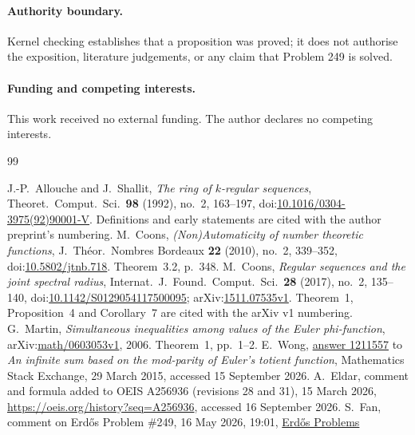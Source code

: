 \paragraph{Authority boundary.} Kernel checking establishes that a proposition
was proved; it does not authorise the exposition, literature judgements, or any
claim that Problem 249 is solved.

\paragraph{Funding and competing interests.} This work received no external
funding. The author declares no competing interests.

\clearpage
\begin{thebibliography}{99}
\small
\raggedright
\setlength{\itemsep}{0pt}
J.-P.~Allouche and J.~Shallit, \emph{The ring of $k$-regular sequences},
Theoret.\ Comput.\ Sci.\ \textbf{98} (1992), no.~2, 163--197,
doi:\href{https://doi.org/10.1016/0304-3975(92)90001-V}{10.1016/0304-3975(92)90001-V}.
Definitions and early statements are cited with the author preprint's numbering.
M.~Coons, \emph{(Non)Automaticity of number theoretic functions},
J.\ Th\'eor.\ Nombres Bordeaux \textbf{22} (2010), no.~2, 339--352,
doi:\href{https://doi.org/10.5802/jtnb.718}{10.5802/jtnb.718}.
Theorem~3.2, p.~348.
M.~Coons, \emph{Regular sequences and the joint spectral radius},
Internat.\ J.\ Found.\ Comput.\ Sci.\ \textbf{28} (2017), no.~2, 135--140,
doi:\href{https://doi.org/10.1142/S0129054117500095}{10.1142/S0129054117500095};
arXiv:\href{https://arxiv.org/abs/1511.07535v1}{1511.07535v1}.
Theorem~1, Proposition~4 and Corollary~7 are cited with the arXiv v1 numbering.
G.~Martin, \emph{Simultaneous inequalities among values of the Euler
phi-function}, arXiv:\href{https://arxiv.org/abs/math/0603053v1}{math/0603053v1}, 2006.
Theorem~1, pp.~1--2.
E.~Wong, \href{https://math.stackexchange.com/a/1211557}{answer 1211557} to
\emph{An infinite sum based on the mod-parity of Euler's totient function},
Mathematics Stack Exchange, 29 March 2015, accessed 15 September 2026.
A.~Eldar, comment and formula added to OEIS A256936 (revisions 28 and 31),
15 March 2026, \url{https://oeis.org/history?seq=A256936},
accessed 16 September 2026.
S.~Fan, comment on Erd\H{o}s Problem \#249, 16 May 2026, 19:01,
\href{https://www.erdosproblems.com/forum/thread/249}{Erd\H{o}s Problems
}
\end{thebibliography}
